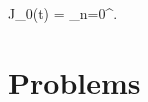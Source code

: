 \documentclass[12pt]{book}
\begin{document}
{  \bee
  J_0(t) = \sum_{n=0}^\infty {}.
  \eee
%
}



\section{Problems}
\end{document}

